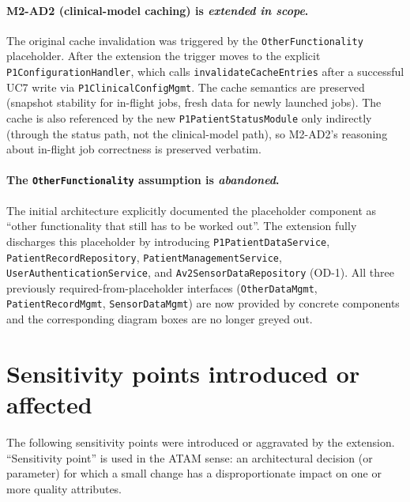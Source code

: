 \paragraph{M2-AD2 (clinical-model caching) is \emph{extended in scope}.}
The original cache invalidation was triggered by the
\texttt{OtherFunctionality} placeholder. After the extension the trigger
moves to the explicit \texttt{P1ConfigurationHandler}, which calls
\texttt{invalidateCacheEntries} after a successful UC7 write via
\texttt{P1ClinicalConfigMgmt}. The cache semantics are preserved
(snapshot stability for in-flight jobs, fresh data for newly launched
jobs). The cache is also referenced by the new
\texttt{P1PatientStatusModule} only indirectly (through the status path,
not the clinical-model path), so M2-AD2's reasoning about in-flight job
correctness is preserved verbatim.

\paragraph{The \texttt{OtherFunctionality} assumption is
\emph{abandoned}.}
The initial architecture explicitly documented the placeholder component
as ``other functionality that still has to be worked out''. The extension
fully discharges this placeholder by introducing
\texttt{P1PatientDataService}, \texttt{PatientRecordRepository},
\texttt{PatientManagementService}, \texttt{UserAuthenticationService},
and \texttt{Av2SensorDataRepository} (OD-1). All three previously
required-from-placeholder interfaces (\texttt{OtherDataMgmt},
\texttt{PatientRecordMgmt}, \texttt{SensorDataMgmt}) are now provided by
concrete components and the corresponding diagram boxes are no longer
greyed out.

\section{Sensitivity points introduced or affected}

The following sensitivity points were introduced or aggravated by the
extension. ``Sensitivity point'' is used in the ATAM sense: an
architectural decision (or parameter) for which a small change has a
disproportionate impact on one or more quality attributes.

